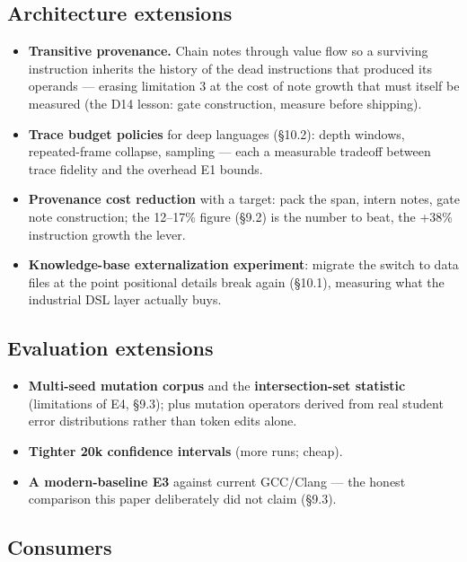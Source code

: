 \subsection{Architecture extensions}

\begin{itemize}
\item \textbf{Transitive provenance.} Chain notes through value flow so a surviving instruction inherits the history of the dead instructions that produced its operands --- erasing limitation 3 at the cost of note growth that must itself be measured (the D14 lesson: gate construction, measure before shipping).
\item \textbf{Trace budget policies} for deep languages (\S10.2): depth windows, repeated-frame collapse, sampling --- each a measurable tradeoff between trace fidelity and the overhead E1 bounds.
\item \textbf{Provenance cost reduction} with a target: pack the span, intern notes, gate note construction; the 12--17\% figure (\S9.2) is the number to beat, the +38\% instruction growth the lever.
\item \textbf{Knowledge-base externalization experiment}: migrate the switch to data files at the point positional details break again (\S10.1), measuring what the industrial DSL layer actually buys.
\end{itemize}

\subsection{Evaluation extensions}

\begin{itemize}
\item \textbf{Multi-seed mutation corpus} and the \textbf{intersection-set statistic} (limitations of E4, \S9.3); plus mutation operators derived from real student error distributions \cite{becker2019unhelpful} rather than token edits alone.
\item \textbf{Tighter 20k confidence intervals} (more runs; cheap).
\item \textbf{A modern-baseline E3} against current GCC/Clang --- the honest comparison this paper deliberately did not claim (\S9.3).
\end{itemize}

\subsection{Consumers}

